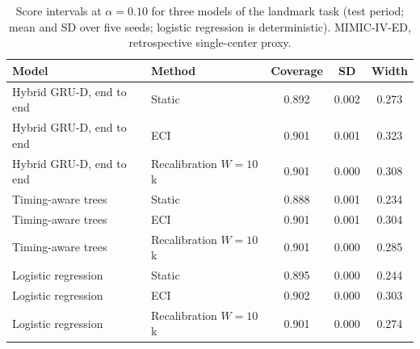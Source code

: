 \begin{table}[t]
\centering
\caption{Score intervals at $\alpha = 0.10$ for three models of the landmark task (test period; mean and SD over five seeds; logistic regression is deterministic). MIMIC-IV-ED, retrospective single-center proxy.}
\label{tab:other-models}
\begin{tabular}{llccc}
\toprule
Model & Method & Coverage & SD & Width \\
\midrule
Hybrid GRU-D, end to end & Static & 0.892 & 0.002 & 0.273 \\
Hybrid GRU-D, end to end & ECI & 0.901 & 0.001 & 0.323 \\
Hybrid GRU-D, end to end & Recalibration $W = 10$k & 0.901 & 0.000 & 0.308 \\
Timing-aware trees & Static & 0.888 & 0.001 & 0.234 \\
Timing-aware trees & ECI & 0.901 & 0.001 & 0.304 \\
Timing-aware trees & Recalibration $W = 10$k & 0.901 & 0.000 & 0.285 \\
Logistic regression & Static & 0.895 & 0.000 & 0.244 \\
Logistic regression & ECI & 0.902 & 0.000 & 0.303 \\
Logistic regression & Recalibration $W = 10$k & 0.901 & 0.000 & 0.274 \\
\bottomrule
\end{tabular}
\end{table}
